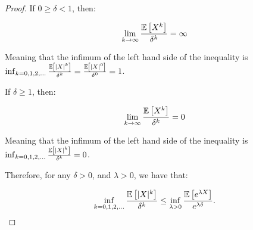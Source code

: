\begin{proof}
If $0 \geq \delta < 1$, then:

\begin{align*}
\lim_{k \to \infty} \frac{\mathbb{E}\left[X^k\right]}{\delta^k} = \infty
\end{align*}

Meaning that the infimum of the left hand side of the inequality is $\inf_{k=0,1,2,\ldots} \frac{\mathbb{E}\left[|X|^k\right]}{\delta^k} = \frac{\mathbb{E}\left[|X|^0\right]}{\delta^0} = 1$.


If $\delta \geq 1$, then:

\begin{align*}
\lim_{k \to \infty} \frac{\mathbb{E}\left[X^k\right]}{\delta^k} = 0
\end{align*}

Meaning that the infimum of the left hand side of the inequality is $\inf_{k=0,1,2,\ldots} \frac{\mathbb{E}\left[|X|^k\right]}{\delta^k} = 0$.

Therefore, for any $\delta > 0$, and $\lambda > 0$, we have that:

\[ \inf_{k=0,1,2,\ldots} \frac{\mathbb{E}\left[|X|^k\right]}{\delta^k} \leq \inf_{\lambda>0} \frac{\mathbb{E}\left[e^{\lambda X}\right]}{e^{\lambda \delta}}. \]
\end{proof}